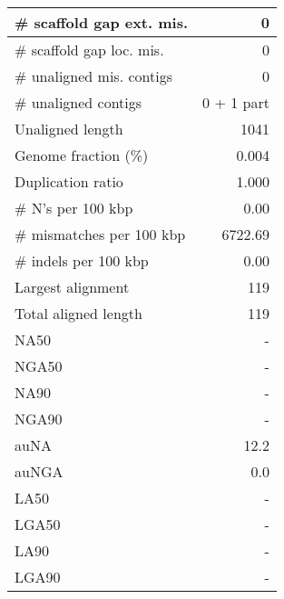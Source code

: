 \documentclass[12pt,a4paper]{article}
\begin{document}
\begin{table}[ht]
\begin{center}
\begin{tabular}{|l*{1}{|r}|}
\# scaffold gap ext. mis. & 0 \\ \hline
\# scaffold gap loc. mis. & 0 \\ \hline
\# unaligned mis. contigs & 0 \\ \hline
\# unaligned contigs & 0 + 1 part \\ \hline
Unaligned length & 1041 \\ \hline
Genome fraction (\%) & 0.004 \\ \hline
Duplication ratio & 1.000 \\ \hline
\# N's per 100 kbp & 0.00 \\ \hline
\# mismatches per 100 kbp & 6722.69 \\ \hline
\# indels per 100 kbp & 0.00 \\ \hline
Largest alignment & 119 \\ \hline
Total aligned length & 119 \\ \hline
NA50 & - \\ \hline
NGA50 & - \\ \hline
NA90 & - \\ \hline
NGA90 & - \\ \hline
auNA & 12.2 \\ \hline
auNGA & 0.0 \\ \hline
LA50 & - \\ \hline
LGA50 & - \\ \hline
LA90 & - \\ \hline
LGA90 & - \\ \hline
\end{tabular}
\end{center}
\end{table}
\end{document}

